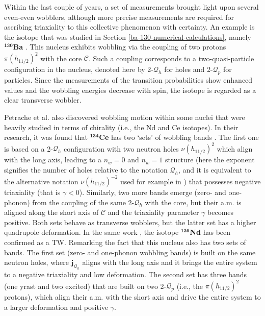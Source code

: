 Within the last couple of years, a set of measurements brought light upon several even-even wobblers, although more precise measurements are required for ascribing triaxiality to this collective phenomenon with certainty. An example is the isotope that was studied in Section \ref{ba-130-numerical-calculations}, namely $^\mathbf{130}$\textbf{Ba} \cite{petrache2019diversity,chen2019transverse,wang2020two}. This nucleus exhibits wobbling via the coupling of two protons $\pi (h_{11/2})^2$ with the core $\mathscr{C}$. Such a coupling corresponds to a two-quasi-particle configuration in the nucleus, denoted here by 2-$\mathcal{Q}_h$ for holes and 2-$\mathcal{Q}_p$ for particles. Since the measurements of the transition probabilities show enhanced values and the wobbling energies decrease with spin, the isotope is regarded as a clear transverse wobbler. 

Petrache et al. also discovered wobbling motion within some nuclei that were heavily studied in terms of chirality (i.e., the Nd and Ce isotopes). In their research, it was found that $^\mathbf{134}$\textbf{Ce} has two `sets' of wobbling bands \cite{petrache2016transverse}. The first one is based on a 2-$\mathcal{Q}_h$ configuration with two neutron holes $\nu (h_{11/2})^2$ which align with the long axis, leading to a $n_w=0$ and $n_w=1$ structure (here the exponent signifies the number of holes relative to the notation $\mathcal{Q}_h$, and it is equivalent to the alternative notation $\nu(h_{11/2})^{-2}$ used for example in \cite{petrache2012tilted,lv2018evolution,chen2021microscopic}) that possesses negative triaxiality (that is $\gamma<0$). Similarly, two more bands emerge (zero- and one-phonon) from the coupling of the same 2-$\mathcal{Q}_h$ with the core, but their a.m. is aligned along the short axis of $\mathscr{C}$ and the triaxiality parameter $\gamma$ becomes positive. Both sets behave as transverse wobblers, but the latter set has a higher quadrupole deformation. In the same work \cite{petrache2016transverse}, the isotope $\mathbf{^{136}}$\textbf{Nd} has been confirmed as a TW. Remarking the fact that this nucleus also has two sets of bands. The first set (zero- and one-phonon wobbling bands) is built on the same neutron holes, where $\mathbf{j}_{\mathcal{Q}_h}$ aligns with the long axis and it brings the entire system to a negative triaxiality and low deformation. The second set has three bands (one yrast and two excited) that are built on two 2-$\mathcal{Q}_p$ (i.e., the $\pi(h_{11/2})^2$ protons), which align their a.m. with the short axis and drive the entire system to a larger deformation and positive $\gamma$.

